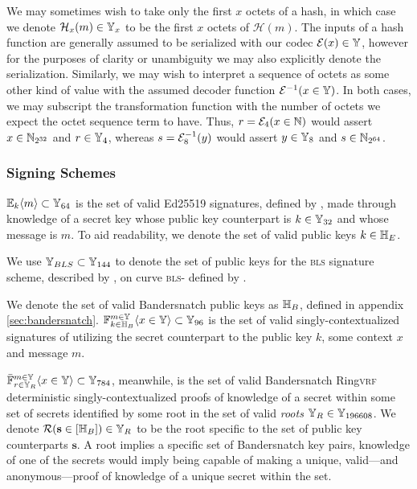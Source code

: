We may sometimes wish to take only the first $x$ octets of a hash, in which case we denote $\mathcal{H}_x(m) \in \Y_x$ to be the first $x$ octets of $\mathcal{H}(m)$. The inputs of a hash function are generally assumed to be serialized with our codec $\mathcal{E}(x) \in \Y$, however for the purposes of clarity or unambiguity we may also explicitly denote the serialization. Similarly, we may wish to interpret a sequence of octets as some other kind of value with the assumed decoder function $\de(x \in \Y)$. In both cases, we may subscript the transformation function with the number of octets we expect the octet sequence term to have. Thus, $r = \mathcal{E}_4(x \in \N)$ would assert $x \in \N_{2^{32}}$ and $r \in \Y_4$, whereas $s = \de_8(y)$ would assert $y \in \Y_8$ and $s \in \N_{2^{64}}$.

\subsubsection{Signing Schemes}\label{sec:signing}

$\sig{k}{m} \subset \Y_{64}$ is the set of valid Ed25519 signatures, defined by \cite{rfc8032}, made through knowledge of a secret key whose public key counterpart is $k \in \Y_{32}$ and whose message is $m$. To aid readability, we denote the set of valid public keys $k \in \H_E$.

We use $\Y_{BLS} \subset \Y_{144}$ to denote the set of public keys for the \textsc{bls} signature scheme, described by \cite{jofc-2004-14130}, on curve \textsc{bls}- defined by \cite{bls12-381}.

We denote the set of valid Bandersnatch public keys as $\H_B$, defined in appendix \ref{sec:bandersnatch}. $\bandersig{k \in \H_B}{x \in \Y}{m \in \Y} \subset \Y_{96}$ is the set of valid singly-contextualized signatures of utilizing the secret counterpart to the public key $k$, some context $x$ and message $m$.

$\bandersnatch{r \in \Y_R}{x \in \Y}{m \in \Y} \subset \Y_{784}$, meanwhile, is the set of valid Bandersnatch Ring\textsc{vrf} deterministic singly-contextualized proofs of knowledge of a secret within some set of secrets identified by some root in the set of valid \emph{roots} $\Y_R \in \Y_{196608}$. We denote $\mathcal{R}(\mathbf{s} \in [\H_B]) \in \Y_R$ to be the root specific to the set of public key counterparts $\mathbf{s}$. A root implies a specific set of Bandersnatch key pairs, knowledge of one of the secrets would imply being capable of making a unique, valid---and anonymous---proof of knowledge of a unique secret within the set.

